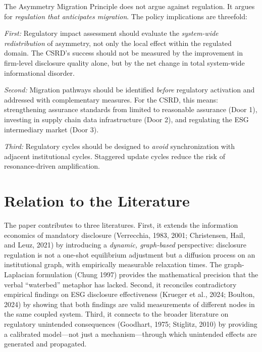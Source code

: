 \documentclass[12pt,a4paper]{article}
\begin{document}
The Asymmetry Migration Principle does not argue against regulation. It argues for \textit{regulation that anticipates migration}. The policy implications are threefold:

\textit{First:} Regulatory impact assessment should evaluate the \textit{system-wide redistribution} of asymmetry, not only the local effect within the regulated domain. The CSRD's success should not be measured by the improvement in firm-level disclosure quality alone, but by the net change in total system-wide informational disorder.

\textit{Second:} Migration pathways should be identified \textit{before} regulatory activation and addressed with complementary measures. For the CSRD, this means: strengthening assurance standards from limited to reasonable assurance (Door 1), investing in supply chain data infrastructure (Door 2), and regulating the ESG intermediary market (Door 3).

\textit{Third:} Regulatory cycles should be designed to \textit{avoid} synchronization with adjacent institutional cycles. Staggered update cycles reduce the risk of resonance-driven amplification.


\section{Relation to the Literature}
\label{sec:literature}

The paper contributes to three literatures. First, it extends the information economics of mandatory disclosure (Verrecchia, 1983, 2001; Christensen, Hail, and Leuz, 2021) by introducing a \textit{dynamic, graph-based} perspective: disclosure regulation is not a one-shot equilibrium adjustment but a diffusion process on an institutional graph, with empirically measurable relaxation times. The graph-Laplacian formulation (Chung 1997) provides the mathematical precision that the verbal ``waterbed'' metaphor has lacked. Second, it reconciles contradictory empirical findings on ESG disclosure effectiveness (Krueger et al., 2024; Boulton, 2024) by showing that both findings are valid measurements of different nodes in the same coupled system. Third, it connects to the broader literature on regulatory unintended consequences (Goodhart, 1975; Stiglitz, 2010) by providing a calibrated model---not just a mechanism---through which unintended effects are generated and propagated.
\end{document}
